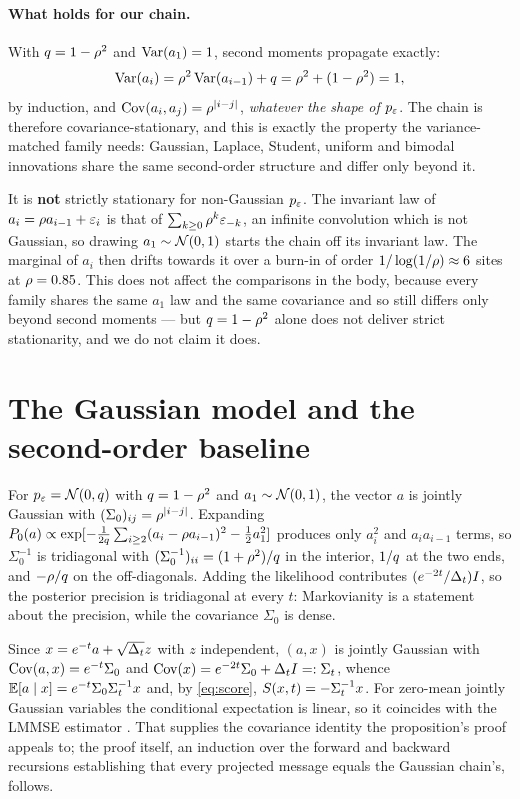\paragraph{What holds for our chain.} With $q=1-\rho^2$ and $\operatorname{Var}(a_1)=1$, second moments
propagate exactly:
\[
\operatorname{Var}(a_i) = \rho^2\operatorname{Var}(a_{i-1}) + q = \rho^2 + (1-\rho^2) = 1 ,
\]
by induction, and $\operatorname{Cov}(a_i,a_j)=\rho^{|i-j|}$, \emph{whatever the shape of $p_{\varepsilon}$}. The chain
is therefore covariance-stationary, and this is exactly the property the variance-matched family
needs: Gaussian, Laplace, Student, uniform and bimodal innovations share the same second-order
structure and differ only beyond it.

It is \textbf{not} strictly stationary for non-Gaussian $p_{\varepsilon}$. The invariant law of
$a_i=\rho a_{i-1}+\varepsilon_i$ is that of $\sum_{k\ge0}\rho^k\varepsilon_{-k}$, an infinite
convolution which is not Gaussian, so drawing $a_1\sim\mathcal{N}\!\left(0,1\right)$ starts the chain off its
invariant law. The marginal of $a_i$ then drifts towards it over a burn-in of order
$1/\log(1/\rho)\approx 6$ sites at $\rho=0.85$. This does not affect the comparisons in the
body, because every family shares the same $a_1$ law and the same covariance and so still differs
only beyond second moments --- but $q=1-\rho^2$ alone does not deliver strict stationarity,
and we do not claim it does.

\section{The Gaussian model and the second-order baseline}
\label{app:lmmse}

For $p_{\varepsilon}=\mathcal{N}\!\left(0,q\right)$ with $q=1-\rho^2$ and $a_1\sim\mathcal{N}\!\left(0,1\right)$, the vector $a$
is jointly Gaussian with $(\Sigma_0)_{ij}=\rho^{|i-j|}$. Expanding
$P_0(a)\propto\exp[-\tfrac{1}{2q}\sum_{i\ge2}(a_i-\rho a_{i-1})^2 - \tfrac12 a_1^2]$
produces only $a_i^2$ and $a_ia_{i-1}$ terms, so $\Sigma_0^{-1}$ is tridiagonal with
$(\Sigma_0^{-1})_{ii} = (1+\rho^2)/q$ in the interior, $1/q$ at the two ends, and
$-\rho/q$ on the off-diagonals. Adding the likelihood contributes $(e^{-2t}/\Delta_t)I$, so the
posterior precision is tridiagonal at every $t$: Markovianity is a statement about the precision,
while the covariance $\Sigma_0$ is dense.

Since $x = e^{-t}a + \sqrt{\Delta_t}z$ with $z$ independent, $(a,x)$ is jointly Gaussian with
$\operatorname{Cov}(a,x) = e^{-t}\Sigma_0$ and $\operatorname{Cov}(x) = e^{-2t}\Sigma_0 + \Delta_t I =: \Sigma_t$, whence
$\mathbb{E}[a\mid x] = e^{-t}\Sigma_0\Sigma_t^{-1}x$ and, by \eqref{eq:score},
$S(x,t) = -\Sigma_t^{-1}x$. For zero-mean jointly Gaussian variables the conditional
expectation is linear, so it coincides with the LMMSE estimator \citep{kay1993}. That supplies the
covariance identity the proposition's proof appeals to; the proof itself, an induction over the
forward and backward recursions establishing that every projected message equals the Gaussian
chain's, follows.

